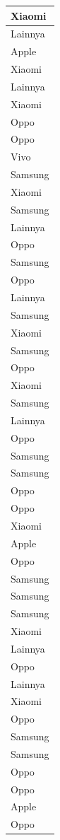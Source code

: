 \documentclass[
  letterpaper,
  DIV=11,
  numbers=noendperiod]{scrartcl}
\begin{document}
\begin{table}
\begin{tabular}[t]{l}
\hline
Xiaomi\\
\hline
Lainnya\\
\hline
Apple\\
\hline
Xiaomi\\
\hline
Lainnya\\
\hline
Xiaomi\\
\hline
Oppo\\
\hline
Oppo\\
\hline
Vivo\\
\hline
Samsung\\
\hline
Xiaomi\\
\hline
Samsung\\
\hline
Lainnya\\
\hline
Oppo\\
\hline
Samsung\\
\hline
Oppo\\
\hline
Lainnya\\
\hline
Samsung\\
\hline
Xiaomi\\
\hline
Samsung\\
\hline
Oppo\\
\hline
Xiaomi\\
\hline
Samsung\\
\hline
Lainnya\\
\hline
Oppo\\
\hline
Samsung\\
\hline
Samsung\\
\hline
Oppo\\
\hline
Oppo\\
\hline
Xiaomi\\
\hline
Apple\\
\hline
Oppo\\
\hline
Samsung\\
\hline
Samsung\\
\hline
Samsung\\
\hline
Xiaomi\\
\hline
Lainnya\\
\hline
Oppo\\
\hline
Lainnya\\
\hline
Xiaomi\\
\hline
Oppo\\
\hline
Samsung\\
\hline
Samsung\\
\hline
Oppo\\
\hline
Oppo\\
\hline
Apple\\
\hline
Oppo\\

\end{tabular}
\end{table}
\end{document}
